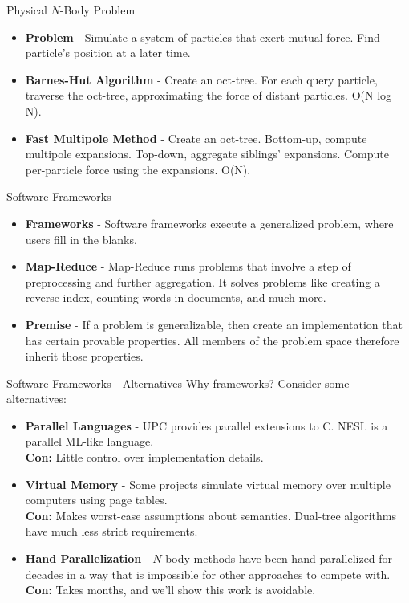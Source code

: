 \documentclass[pdf,colorBG,slideColor]{prosper}
\newcommand{\itemt}[1]{\item {\bf #1} -}
\begin{document}
\begin{slide}{Physical $N$-Body Problem}
  \begin{itemize}
    \itemt{Problem}
    Simulate a system of particles that exert mutual force.
    Find particle's position at a later time.
    \itemt{Barnes-Hut Algorithm}
    Create an oct-tree.
    For each query particle, traverse the oct-tree, approximating the force
    of distant particles. O(N log N).
    \itemt{Fast Multipole Method}
    Create an oct-tree.
    Bottom-up, compute multipole expansions.
    Top-down, aggregate siblings' expansions.
    Compute per-particle force using the expansions.
    O(N).
  \end{itemize}
\end{slide}

\begin{slide}{Software Frameworks}
  \begin{itemize}
    \itemt{Frameworks}
    Software frameworks execute a generalized problem, where
    users fill in the blanks.
    \itemt{Map-Reduce}
    Map-Reduce runs problems that involve a step of preprocessing and
    further aggregation.
    It solves problems like creating a reverse-index, counting words
    in documents, and much more.
    \itemt{Premise}
    If a problem is generalizable, then create an implementation that
    has certain provable properties.
    All members of the problem space therefore inherit those properties.
  \end{itemize}
\end{slide}

\begin{slide}{Software Frameworks - Alternatives}
  Why frameworks?  Consider some alternatives:
  \begin{itemize}
    \itemt{Parallel Languages}
    UPC provides parallel extensions to C.  NESL is a parallel ML-like
    language.
    \\ {\bf Con:} Little control over implementation details.
    \itemt{Virtual Memory}
    Some projects simulate virtual memory over multiple computers
    using page tables.
    \\ {\bf Con:} Makes worst-case assumptions about semantics.
    Dual-tree algorithms have much less strict requirements.
    \itemt{Hand Parallelization}
    $N$-body methods have been hand-parallelized for decades in a way that
    is impossible for other approaches to compete with.
    \\ {\bf Con:} Takes months, and we'll show this work is avoidable.
  \end{itemize}
\end{slide}
\end{document}
